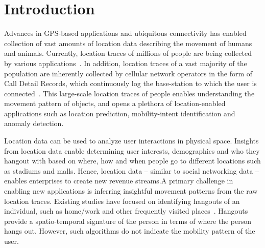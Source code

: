 \section{Introduction}
Advances in GPS-based applications and ubiquitous connectivity has enabled collection of vast amounts of location data describing the movement of humans and animals. Currently, location traces of millions of people are being collected by various applications~\cite{waze}. In addition, location traces of a vast majority of the population are inherently collected by cellular network operators in the form of Call Detail Records, which continuously log the base-station to which the user is connected~\cite{tdrs}. This large-scale location traces of people enables understanding the movement pattern of objects, and opens a plethora of location-enabled applications such as location prediction, mobility-intent identification and anomaly detection. 

Location data can be used to analyze user interactions in physical space. Insights from location data enable determining user interests, demographics and who they hangout with based on where, how and when people go to different locations such as stadiums and malls. Hence, location data -- similar to social networking data --enables enterprises to create new revenue streams.A primary challenge in enabling new applications is inferring insightful movement patterns from the raw location traces. Existing studies have focused on identifying hangouts of an individual, such as home/work and other frequently visited places~\cite{Do2014}. Hangouts provide a spatio-temporal signature of the person in terms of where the person hangs out. However, such algorithms do not indicate the mobility pattern of the user. 

